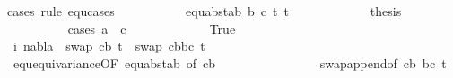 \begin{isabellebody}
{\isacharparenleft}{\kern0pt}cases\ rule{\isacharcolon}{\kern0pt}\ equ{\isachardot}{\kern0pt}cases{\isacharparenright}{\kern0pt}\isanewline
\ \ \ \ \ \ \ \ \ \isamarkupfalse%
\ {\isacharparenleft}{\kern0pt}equ{\isacharunderscore}{\kern0pt}abst{\isacharunderscore}{\kern0pt}ab\ b\ c\ t{}{\isacharprime}{\kern0pt}\ t{}{\isacharprime}{\kern0pt}{\isacharparenright}{\kern0pt}\isanewline
\ \ \ \ \ \ \ \ \ \isamarkupfalse%
\ \isamarkupfalse%
\ {\isacharquery}{\kern0pt}thesis\ \isanewline
\ \ \ \ \ \ \ \ \ \isamarkupfalse%
{\isacharparenleft}{\kern0pt}cases\ {\isachardoublequoteopen}a\ {\isacharequal}{\kern0pt}\ c{\isachardoublequoteclose}{\isacharparenright}{\kern0pt}\isanewline
\ \ \ \ \ \ \ \ \ \ \ \isamarkupfalse%
\ True\isanewline
\ \ \ \ \ \ \ \ \ \ \ \isamarkupfalse%
\ i{\isacharcolon}{\kern0pt}\ {\isachardoublequoteopen}nabla\ {\isasymturnstile}\ swap\ {\isacharbrackleft}{\kern0pt}{\isacharparenleft}{\kern0pt}c{\isacharcomma}{\kern0pt}b{\isacharparenright}{\kern0pt}{\isacharbrackright}{\kern0pt}\ t{}{\isacharprime}{\kern0pt}\ {\isasymapprox}\ swap\ {\isacharparenleft}{\kern0pt}{\isacharbrackleft}{\kern0pt}{\isacharparenleft}{\kern0pt}c{\isacharcomma}{\kern0pt}b{\isacharparenright}{\kern0pt}{\isacharbrackright}{\kern0pt}{\isacharat}{\kern0pt}{\isacharbrackleft}{\kern0pt}{\isacharparenleft}{\kern0pt}b{\isacharcomma}{\kern0pt}c{\isacharparenright}{\kern0pt}{\isacharbrackright}{\kern0pt}{\isacharparenright}{\kern0pt}\ t{}{\isacharprime}{\kern0pt}{\isachardoublequoteclose}\isanewline
\ \ \ \ \ \ \ \ \ \ \ \ \ \isamarkupfalse%
\ equ{\isacharunderscore}{\kern0pt}equivariance{\isacharbrackleft}{\kern0pt}OF\ equ{\isacharunderscore}{\kern0pt}abst{\isacharunderscore}{\kern0pt}ab{\isacharparenleft}{\kern0pt}{}{\isacharparenright}{\kern0pt}{\isacharcomma}{\kern0pt}\ of\ {\isacartoucheopen}{\isacharbrackleft}{\kern0pt}{\isacharparenleft}{\kern0pt}c{\isacharcomma}{\kern0pt}b{\isacharparenright}{\kern0pt}{\isacharbrackright}{\kern0pt}{\isacartoucheclose}{\isacharbrackright}{\kern0pt}\ {}{\isacharparenleft}{\kern0pt}{}{\isacharparenright}{\kern0pt}\isanewline
\ \ \ \ \ \ \ \ \ \ \ \ \ \ \ swap{\isacharunderscore}{\kern0pt}append{\isacharbrackleft}{\kern0pt}of\ {\isacartoucheopen}{\isacharbrackleft}{\kern0pt}{\isacharparenleft}{\kern0pt}c{\isacharcomma}{\kern0pt}b{\isacharparenright}{\kern0pt}{\isacharbrackright}{\kern0pt}{\isacartoucheclose}\ {\isacartoucheopen}{\isacharbrackleft}{\kern0pt}{\isacharparenleft}{\kern0pt}b{\isacharcomma}{\kern0pt}c{\isacharparenright}{\kern0pt}{\isacharbrackright}{\kern0pt}{\isacartoucheclose}\ t{}{\isacharprime}{\kern0pt}{\isacharbrackright}{\kern0pt}\ \isamarkupfalse%

\end{isabellebody}
